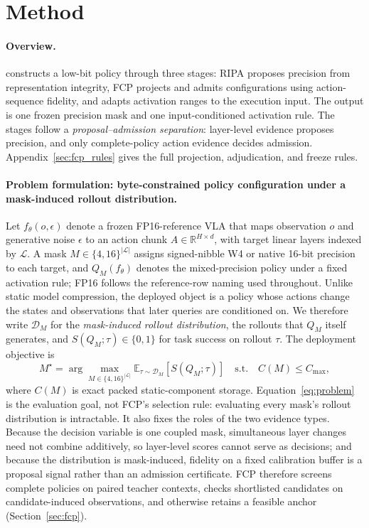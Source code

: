 \section{Method}
\label{sec:method}

\paragraph{Overview.}
\method constructs a low-bit policy through three stages: RIPA proposes precision from representation integrity, FCP projects and admits configurations using action-sequence fidelity, and \dyrange adapts activation ranges to the execution input. The output is one frozen precision mask and one input-conditioned activation rule. The stages follow a \emph{proposal--admission separation}: layer-level evidence proposes precision, and only complete-policy action evidence decides admission. Appendix~\ref{sec:fcp_rules} gives the full projection, adjudication, and freeze rules.

\paragraph{Problem formulation: byte-constrained policy configuration under a mask-induced rollout distribution.}
\label{sec:problem}

Let $f_{\theta}(o,\epsilon)$ denote a frozen FP16-reference VLA that maps observation $o$ and generative noise $\epsilon$ to an action chunk $A\in\mathbb{R}^{H\times d}$, with target linear layers indexed by $\mathcal{L}$. A mask $M\in\{4,16\}^{|\mathcal{L}|}$ assigns signed-nibble W4 or native 16-bit precision to each target, and $Q_M(f_\theta)$ denotes the mixed-precision policy under a fixed activation rule; FP16 follows the reference-row naming used throughout. Unlike static model compression, the deployed object is a policy whose actions change the states and observations that later queries are conditioned on. We therefore write $\mathcal D_M$ for the \emph{mask-induced rollout distribution}, the rollouts that $Q_M$ itself generates, and $S(Q_M;\tau)\in\{0,1\}$ for task success on rollout $\tau$. The deployment objective is
\begin{equation}
 M^\star=\arg\max_{M\in\{4,16\}^{|\mathcal L|}}
 \mathbb E_{\tau\sim\mathcal D_M}\!\left[S(Q_M;\tau)\right]
 \quad\text{s.t.}\quad C(M)\le C_{\max},
 \label{eq:problem}
\end{equation}
where $C(M)$ is exact packed static-component storage. Equation~\ref{eq:problem} is the evaluation goal, not FCP's selection rule: evaluating every mask's rollout distribution is intractable. It also fixes the roles of the two evidence types. Because the decision variable is one coupled mask, simultaneous layer changes need not combine additively, so layer-level scores cannot serve as decisions; and because the distribution is mask-induced, fidelity on a fixed calibration buffer is a proposal signal rather than an admission certificate. FCP therefore screens complete policies on paired teacher contexts, checks shortlisted candidates on candidate-induced observations, and otherwise retains a feasible anchor (Section~\ref{sec:fcp}).

